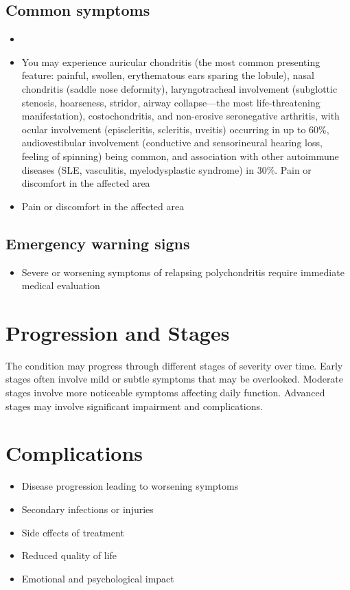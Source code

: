 \subsection{Common symptoms}
\begin{itemize}[noitemsep]
  \item \item You may experience auricular chondritis (the most common presenting feature: painful, swollen, erythematous ears sparing the lobule), nasal chondritis (saddle nose deformity), laryngotracheal involvement (subglottic stenosis, hoarseness, stridor, airway collapse---the most life-threatening manifestation), costochondritis, and non-erosive seronegative arthritis, with ocular involvement (episcleritis, scleritis, uveitis) occurring in up to 60\%, audiovestibular involvement (conductive and sensorineural hearing loss, feeling of spinning) being common, and association with other autoimmune diseases (SLE, vasculitis, myelodysplastic syndrome) in 30\%. Pain or discomfort in the affected area    \item Pain or discomfort in the affected area
  \end{itemize}

\subsection{Emergency warning signs}
\begin{itemize}[noitemsep]
  \item Severe or worsening symptoms of relapsing polychondritis require immediate medical evaluation
\end{itemize}
\section{Progression and Stages}
The condition may progress through different stages of severity over time. Early stages often involve mild or subtle symptoms that may be overlooked. Moderate stages involve more noticeable symptoms affecting daily function. Advanced stages may involve significant impairment and complications.
\section{Complications}
\begin{itemize}[noitemsep]
  \item Disease progression leading to worsening symptoms
  \item Secondary infections or injuries
  \item Side effects of treatment
  \item Reduced quality of life
  \item Emotional and psychological impact
\end{itemize}
